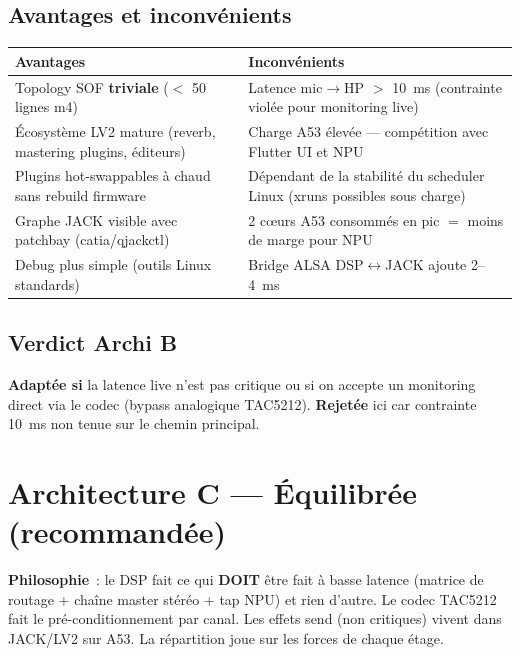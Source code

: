 \documentclass[11pt,a4paper]{article}
\begin{document}
\subsection{Avantages et inconvénients}
\begin{center}
\begin{tabularx}{\textwidth}{p{} X}
\toprule
\textbf{\textcolor{ca53}{Avantages}} & \textbf{\textcolor{chw}{Inconvénients}} \\
\midrule
Topology SOF \textbf{triviale} ($<$ 50 lignes m4) & Latence mic$\rightarrow$HP $>$ 10~ms (contrainte violée pour monitoring live) \\
Écosystème LV2 mature (reverb, mastering plugins, éditeurs) & Charge A53 élevée --- compétition avec Flutter UI et NPU \\
Plugins hot-swappables à chaud sans rebuild firmware & Dépendant de la stabilité du scheduler Linux (xruns possibles sous charge) \\
Graphe JACK visible avec patchbay (catia/qjackctl) & 2 cœurs A53 consommés en pic $=$ moins de marge pour NPU \\
Debug plus simple (outils Linux standards) & Bridge ALSA DSP$\leftrightarrow$JACK ajoute 2--4~ms \\
\bottomrule
\end{tabularx}
\end{center}

\subsection{Verdict Archi B}
\textbf{Adaptée si} la latence live n'est pas critique ou si on accepte un monitoring direct via le codec (bypass analogique TAC5212). \textbf{Rejetée} ici car contrainte 10~ms non tenue sur le chemin principal.

\clearpage
\section{Architecture C --- Équilibrée (recommandée)}
\label{sec:archiC}

\textbf{Philosophie}~: le DSP fait ce qui \textbf{DOIT} être fait à basse latence (matrice de routage + chaîne master stéréo + tap NPU) et rien d'autre. Le codec TAC5212 fait le pré-conditionnement par canal. Les effets send (non critiques) vivent dans JACK/LV2 sur A53. La répartition joue sur les forces de chaque étage.
\end{document}
